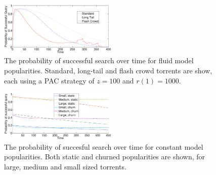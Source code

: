     \begin{figure}[t]
        \centering
        \includegraphics[width=0.5\textwidth]{Images/SimulatedProbabilities.eps}
        \caption{The probability of successful search over time for fluid model popularities. Standard, long-tail and flash crowd torrents are show, each using a PAC strategy of $z=100$ and $r(1)=1000$.}
        \label{fig:probabilities}
    \end{figure}

    \begin{figure}[t]
        \centering
        \includegraphics[width=0.5\textwidth]{Images/SimulatedConstant.eps}
        \caption{The probability of succesful search over time for constant model popularities. Both static and churned popularities are shown, for large, medium and small sized torrents.}
        \label{fig:constant_probabilities}
    \end{figure}

